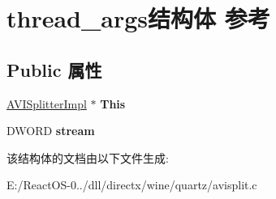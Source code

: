 \hypertarget{structthread__args}{}\section{thread\+\_\+args结构体 参考}
\label{structthread__args}
\subsection*{Public 属性}
\begin{DoxyCompactItemize}
\item 
\mbox{\label{structthread__args_ab054a68cdec53c31129fc7e8f28b17bf}} 
\hyperlink{struct_a_v_i_splitter_impl}{A\+V\+I\+Splitter\+Impl} $\ast$ {\bfseries This}
\item 
\mbox{\label{structthread__args_a22766ad2a97a69081f0ac291c6f075c8}} 
D\+W\+O\+RD {\bfseries stream}
\end{DoxyCompactItemize}


该结构体的文档由以下文件生成\+:\begin{DoxyCompactItemize}
\item 
E\+:/\+React\+O\+S-\/0../dll/directx/wine/quartz/avisplit.\+c\end{DoxyCompactItemize}
